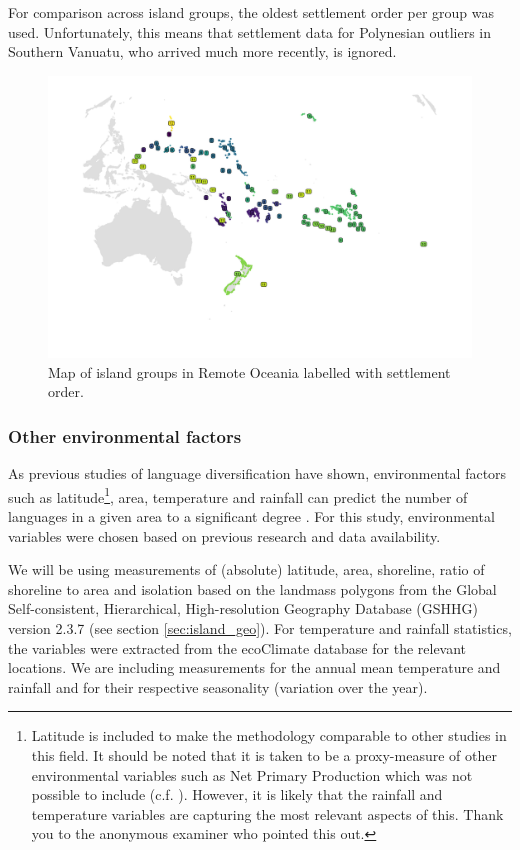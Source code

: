 \documentclass[a4paper,10pt]{article} %
\begin{document}
For comparison across island groups, the oldest settlement order per group was used. Unfortunately, this means that settlement data for Polynesian outliers in Southern Vanuatu, who arrived much more recently, is ignored.

\begin{figure}
\centering
\includegraphics[width=19cm]{illustrations/plots_from_R/Map_RO_dates.png}
\caption{{Map of island groups in Remote Oceania labelled with settlement order.}}
\label{dates_map}
\end{figure}

\subsubsection{Other environmental factors} 
As previous studies of language diversification have shown, environmental factors such as latitude\footnote{Latitude is included to make the methodology comparable to other studies in this field. It should be noted that it is taken to be a proxy-measure of other environmental variables such as Net Primary Production which was not possible to include (c.f. \citet{hillebrand2004generality}). However, it is likely that the rainfall and temperature variables are capturing the most relevant aspects of this. Thank you to the anonymous examiner who pointed this out.}, area, temperature and rainfall can predict the number of languages in a given area to a significant degree \citep{ greenhill2015demographic, gavin2017process, Pacheco_Coelho_2019, hua2019ecological}. For this study, environmental variables were chosen based on previous research and data availability. 

We will be using measurements of (absolute) latitude, area, shoreline, ratio of shoreline to area and isolation based on the landmass polygons from the Global Self-consistent, Hierarchical, High-resolution Geography Database (GSHHG) version 2.3.7 \citep{wessel1996global} (see section \ref{sec:island_geo}). For temperature and rainfall statistics, the variables were extracted from the ecoClimate database \citep{ecoclimate} for the relevant locations. We are including measurements for the annual mean temperature and rainfall and for their respective seasonality (variation over the year).
\end{document}
